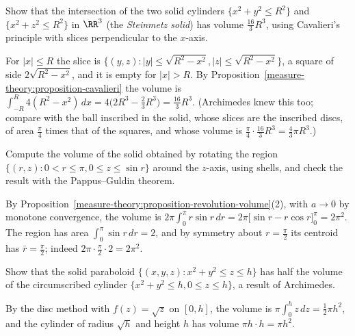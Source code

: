 \begin{exercise}\label{measure-theory:exercise-steinmetz}
Show that the intersection of the two solid cylinders $\{x^2 + y^2 \leq R^2\}$ and $\{x^2 + z^2 \leq R^2\}$ in $\RR^3$ (the \emph{Steinmetz solid}) has volume $\frac{16}{3}R^3$, using Cavalieri's principle with
slices perpendicular to the $x$-axis.
\end{exercise}

\begin{solution}
For $|x| \leq R$ the slice is $\{(y, z) : |y| \leq \sqrt{R^2 - x^2}, |z| \leq \sqrt{R^2 - x^2}\}$, a square of side $2\sqrt{R^2 - x^2}$, and it is empty for $|x| > R$. By
Proposition~\ref{measure-theory:proposition-cavalieri} the volume is $\int_{-R}^R4(R^2 - x^2)\,dx = 4\bigl(2R^3 - \frac23R^3\bigr) = \frac{16}{3}R^3$. (Archimedes knew this too; compare with the ball inscribed in the
solid, whose slices are the inscribed discs, of area $\frac\pi4$ times that of the squares, and whose volume is $\frac\pi4 \cdot \frac{16}{3}R^3 = \frac43\pi R^3$.)
\end{solution}

\begin{exercise}\label{measure-theory:exercise-shells}
Compute the volume of the solid obtained by rotating the region $\{(r, z) : 0 < r \leq \pi, 0 \leq z \leq \sin r\}$ around the $z$-axis, using shells, and check the result with the Pappus--Guldin theorem.
\end{exercise}

\begin{solution}
By Proposition~\ref{measure-theory:proposition-revolution-volume}(2), with $a \to 0$ by monotone convergence, the volume is $2\pi\int_0^\pi r\sin r\,dr = 2\pi\bigl[\sin r - r\cos r\bigr]_0^\pi = 2\pi^2$. The region has area
$\int_0^\pi\sin r\,dr = 2$, and by symmetry about $r = \frac\pi2$ its centroid has $\bar r = \frac\pi2$; indeed $2\pi \cdot \frac\pi2 \cdot 2 = 2\pi^2$.
\end{solution}

\begin{exercise}\label{measure-theory:exercise-paraboloid}
Show that the solid paraboloid $\{(x, y, z) : x^2 + y^2 \leq z \leq h\}$ has half the volume of the circumscribed cylinder $\{x^2 + y^2 \leq h, 0 \leq z \leq h\}$, a result of Archimedes.
\end{exercise}

\begin{solution}
By the disc method with $f(z) = \sqrt z$ on $[0, h]$, the volume is $\pi\int_0^hz\,dz = \frac12\pi h^2$, and the cylinder of radius $\sqrt h$ and height $h$ has volume $\pi h \cdot h = \pi h^2$.
\end{solution}

